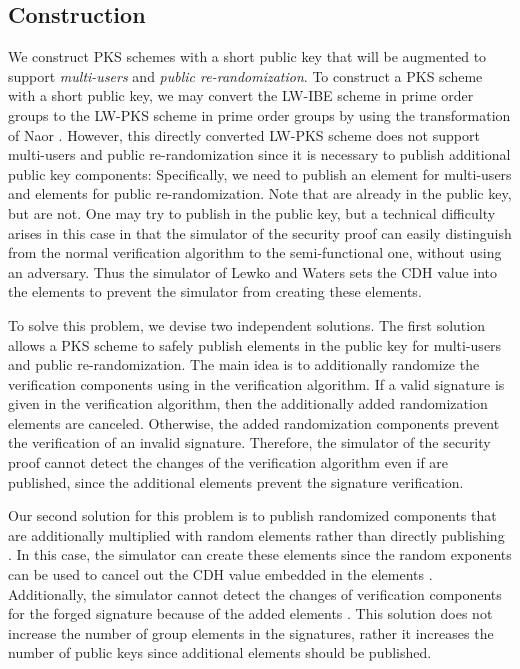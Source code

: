 \documentclass[11pt,letterpaper]{article}
\begin{document}
\subsection{Construction} \label{sec:pks-prime}

We construct PKS schemes with a short public key that will be augmented to
support \textit{multi-users} and \textit{public re-randomization}. To
construct a PKS scheme with a short public key, we may convert the LW-IBE
scheme \cite{LewkoW10} in prime order groups to the LW-PKS scheme in prime
order groups by using the transformation of Naor \cite{BonehF01}. However,
this directly converted LW-PKS scheme does not support multi-users and public
re-randomization since it is necessary to publish additional public key
components: Specifically, we need to publish an element  for multi-users
and elements  for public re-randomization. Note that  are already in the public key, but  are not. One
may try to publish  in the public key, but a technical difficulty
arises in this case in that the simulator of the security proof can easily
distinguish from the normal verification algorithm to the semi-functional
one, without using an adversary. Thus the simulator of Lewko and Waters sets
the CDH value into the elements  to prevent the simulator from
creating these elements.

To solve this problem, we devise two independent solutions. The first
solution allows a PKS scheme to safely publish elements  in the
public key for multi-users and public re-randomization. The main idea is to
additionally randomize the verification components using  in the verification algorithm. If a valid
signature is given in the verification algorithm, then the additionally added
randomization elements  are
canceled. Otherwise, the added randomization components prevent the
verification of an invalid signature. Therefore, the simulator of the
security proof cannot detect the changes of the verification algorithm even
if  are published, since the additional elements  prevent the signature verification.

Our second solution for this problem is to publish randomized components  that are additionally multiplied with
random elements rather than directly publishing . In this case, the
simulator can create these elements since the random exponents  can be used to cancel out the CDH value embedded in the elements . Additionally, the simulator cannot detect the changes of verification
components for the forged signature because of the added elements . This solution does not increase the number of group
elements in the signatures, rather it increases the number of public keys
since additional elements  should be published.
\end{document}
